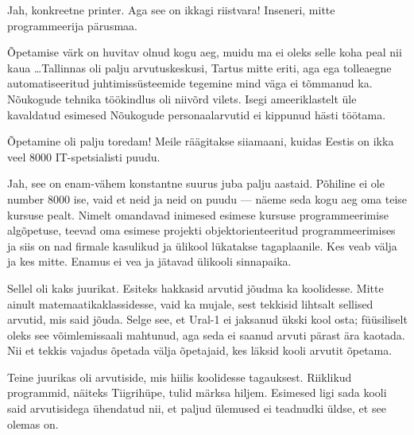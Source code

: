 
Jah, konkreetne printer. Aga see on ikkagi riistvara! Inseneri, mitte programmeerija pärusmaa.


Õpetamise värk on huvitav olnud kogu aeg, muidu ma ei oleks selle 
koha peal nii kaua \ldots Tallinnas oli palju arvutuskeskusi, Tartus mitte eriti, aga ega
tolleaegne automatiseeritud juhtimissüsteemide 
tegemine mind väga ei tõmmanud ka. Nõukogude tehnika töökindlus oli niivõrd vilets. Isegi 
ameeriklastelt üle kavaldatud esimesed Nõukogude personaalarvutid ei kippunud 
hästi töötama. 

Õpetamine oli palju toredam! Meile räägitakse siiamaani, kuidas 
Eestis on ikka veel 8000 IT-spetsialisti puudu. 


Jah, see on enam-vähem konstantne suurus juba 
palju aastaid. Põhiline ei ole number 8000 ise, vaid
et neid ja neid on puudu --- näeme seda kogu aeg oma teise kursuse pealt. 
Nimelt omandavad inimesed esimese kursuse programmeerimise algõpetuse, teevad 
oma esimese projekti objektorienteeritud programmeerimises ja siis on nad 
firmale kasulikud ja ülikool lükatakse tagaplaanile. Kes veab välja 
ja kes mitte. Enamus ei vea ja jätavad ülikooli sinnapaika. 


Sellel oli kaks juurikat. Esiteks hakkasid arvutid 
jõudma ka koolidesse. Mitte ainult matemaatikaklassidesse, vaid ka mujale, sest 
tekkisid lihtsalt sellised arvutid, mis said jõuda. Selge see, et Ural-1 ei jaksanud ükski 
kool osta; füüsiliselt oleks see võimlemissaali mahtunud, 
aga seda ei saanud arvuti pärast ära kaotada. Nii et tekkis vajadus õpetada välja õpetajaid, kes 
läksid kooli arvutit õpetama. 

Teine juurikas oli arvutiside, mis hiilis koolidesse tagauksest. Riiklikud programmid, näiteks
Tiigrihüpe, tulid märksa hiljem. Esimesed ligi sada kooli said arvutisidega ühendatud nii, et paljud ülemused ei 
teadnudki üldse, et see olemas on. 

